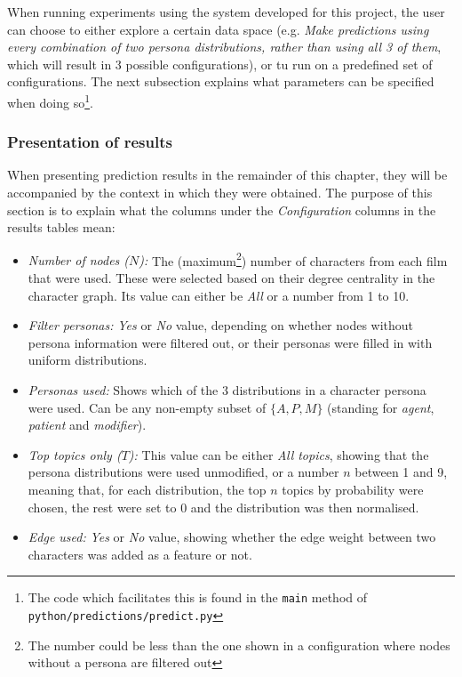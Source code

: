 \documentclass[bsc,frontabs,singlespacing,parskip]{infthesis} %
\begin{document}
When running experiments using the system developed for this project, the user can choose to either explore a certain data space (e.g. \textit{Make predictions using every combination of two persona distributions, rather than using all 3 of them}, which will result in 3 possible configurations), or tu run on a predefined set of configurations. The next subsection explains what parameters can be specified when doing so\footnote{The code which facilitates this is found in the \texttt{main} method of \texttt{python/predictions/predict.py}}. 

\subsubsection{Presentation of results}
When presenting prediction results in the remainder of this chapter, they will be accompanied by the context in which they were obtained. The purpose of this section is to explain what the columns under the \textit{Configuration} columns in the results tables mean:
\begin{itemize}
	\item \textit{Number of nodes ($N$):} The (maximum\footnote{The number could be less than the one shown in a configuration where nodes without a persona are filtered out}) number of characters from each film that were used. These were selected based on their degree centrality in the character graph. Its value can either be \textit{All} or a number from 1 to 10.
	\item \textit{Filter personas:} \textit{Yes} or \textit{No} value, depending on whether nodes without persona information were filtered out, or their personas were filled in with uniform distributions.
	\item \textit{Personas used:} Shows which of the 3 distributions in a character persona were used. Can be any non-empty subset of $\{A, P, M\}$ (standing for \textit{agent}, \textit{patient} and \textit{modifier}).
	\item \textit{Top topics only ($T$):} This value can be either \textit{All topics}, showing that the persona distributions were used unmodified, or a number $n$ between 1 and 9, meaning that, for each distribution, the top $n$ topics by probability were chosen, the rest were set to 0 and the distribution was then normalised.
	\item \textit{Edge used:} \textit{Yes} or \textit{No} value, showing whether the edge weight between two characters was added as a feature or not.
\end{itemize}
\end{document}

